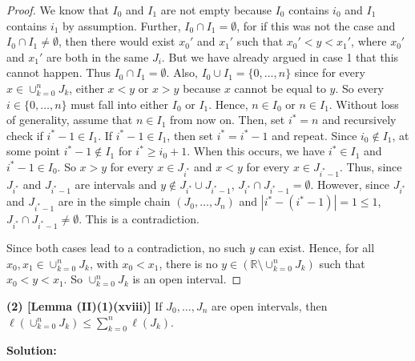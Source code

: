 \documentclass[12pt]{article}
\begin{document}
\begin{proof}
We know that $I_{0}$ and $I_{1}$ are not empty because $I_{0}$ contains $i_{0}$
and $I_{1}$ contains $i_{1}$ by assumption. Further, $I_{0} \cap I_{1} =
\emptyset$, for if this was not the case and $I_{0} \cap I_{1} \neq \emptyset$,
then there would exist $x_{0}'$ and $x_{1}'$ such that $x_{0}' < y < x_{1}'$,
where $x_{0}'$ and $x_{1}'$ are both in the same $J_{i}$. But we have already
argued in case 1 that this cannot happen. Thus $I_{0} \cap I_{1} = \emptyset$.
Also, $I_{0} \cup I_{1} = \{0, \dots, n\}$ since for every $x \in
\cup_{k=0}^{n}J_{k}$, either $x < y$ or $x > y$ because $x$ cannot be equal to
$y$. So every $i \in \{0, \dots, n\}$ must fall into either $I_{0}$ or $I_{1}$.
Hence, $n \in I_{0}$ or $n \in I_{1}$. Without loss of generality, assume that
$n \in I_{1}$ from now on. Then, set $i^{*} = n$ and recursively check if $i^{*}
- 1 \in I_{1}$. If $i^{*} - 1 \in I_{1}$, then set $i^{*} = i^{*} - 1$ and repeat. 
Since $i_{0} \notin I_{1}$, at some point $i^{*} - 1 \notin I_{1}$ for $i^{*}
\geq i_{0} + 1$. When this occurs, we have $i^{*} \in I_{1}$ and $i^{*} - 1 \in
I_{0}$. So $x > y$ for every $x \in J_{i^{*}}$ and $x < y$ for every $x \in
J_{i^{*} - 1}$. Thus, since $J_{i^{*}}$ and $J_{i^{*}-1}$ are intervals and
$y\notin J_{i^{*}} \cup J_{i^{*}-1}$, $J_{i^{*}}\cap J_{i^{*}-1} = \emptyset$.
However, since $J_{i^{*}}$ and $J_{i^{*}-1}$ are in the simple chain $(J_{0},
\dots, J_{n})$ and $|i^{*} - (i^{*}-1)| = 1 \leq 1$, $J_{i^{*}} \cap J_{i^{*}-1}
\neq \emptyset$. This is a contradiction.

Since both cases lead to a contradiction, no such $y$ can exist. Hence, for all
$x_{0}, x_{1} \in \cup_{k=0}^{n}J_{k}$, with $x_{0} < x_{1}$, there is no $y\in
(\mathbb{R}\setminus \cup_{k=0}^{n}J_{k})$ such that $x_{0} < y < x_{1}$. So
$\cup_{k=0}^{n}J_{k}$ is an open interval.
\end{proof}

{\bf (2) [Lemma (II)(1)(xviii)]} If $J_{0}, \dots, J_{n}$ are open intervals,
then $\ell(\cup_{k=0}^{n}J_{k}) \leq \sum_{k=0}^{n}\ell(J_{k})$.

{\bf Solution:}
\end{document}
